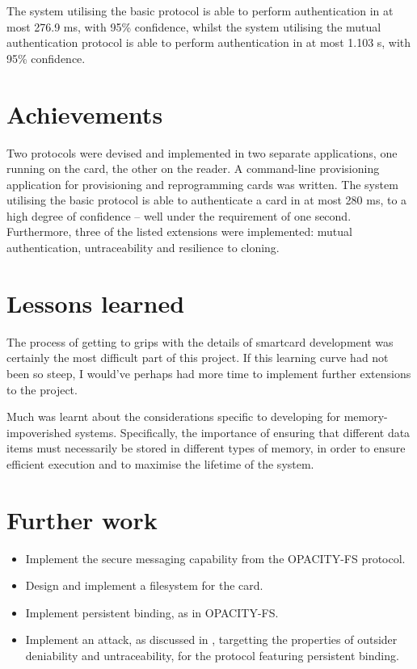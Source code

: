\documentclass[12pt,a4paper,twoside,openright]{report}
\begin{document}
The system utilising the basic protocol is able to perform authentication in at most 276.9 ms, with 95\% confidence, whilst the system utilising the mutual authentication protocol is able to perform authentication in at most 1.103 s, with 95\% confidence.

\section{Achievements}

Two protocols were devised and implemented in two separate applications, one running on the card, the other on the reader. A command-line provisioning application for provisioning and reprogramming cards was written. The system utilising the basic protocol is able to authenticate a card in at most 280 ms, to a high degree of confidence -- well under the requirement of one second. Furthermore, three of the listed extensions were implemented: mutual authentication, untraceability and resilience to cloning.

\section{Lessons learned}

The process of getting to grips with the details of smartcard development was certainly the most difficult part of this project. If this learning curve had not been so steep, I would've perhaps had more time to implement further extensions to the project.

Much was learnt about the considerations specific to developing for memory-impoverished systems. Specifically, the importance of ensuring that different data items must necessarily be stored in different types of memory, in order to ensure efficient execution and to maximise the lifetime of the system.

\section{Further work}

\begin{itemize}
\item Implement the secure messaging capability from the OPACITY-FS protocol.
\item Design and implement a filesystem for the card.
\item Implement persistent binding, as in OPACITY-FS.
\item Implement an attack, as discussed in \cite{opacityanalysis}, targetting the properties of outsider deniability and untraceability, for the protocol featuring persistent binding.
\end{itemize}
\end{document}
